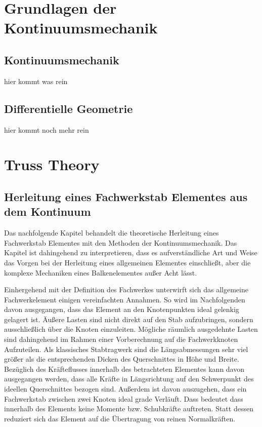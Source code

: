 \documentclass[german,a4paper,12pt,oneside]{scrbook}
\theoremstyle{definition}
\theoremstyle{definition}
\theoremstyle{definition}
\theoremstyle{definition}
\theoremstyle{definition}
\theoremstyle{definition}
\begin{document}

\chapter{Grundlagen der Kontinuumsmechanik}
\section{Kontinuumsmechanik}
hier kommt was rein

\section{Differentielle Geometrie}
hier kommt noch mehr rein

\chapter{Truss Theory}  \setcounter{page}{1}   %




\section{Herleitung eines Fachwerkstab Elementes aus dem Kontinuum}

Das nachfolgende Kapitel behandelt die theoretische Herleitung eines Fachwerkstab Elementes mit den Methoden der Kontinuumsmechanik. Das Kapitel ist dahingehend zu interpretieren, dass es aufverständliche Art und Weise das Vorgen bei der Herleitung eines allgemeinen Elementes einschließt, aber die komplexe Mechaniken eines Balkenelementes außer Acht lässt.

Einhergehend mit der Definition des Fachwerkes unterwirft sich das allgemeine Fachwerkelement einigen vereinfachten Annahmen. So wird im Nachfolgenden davon ausgegangen, dass das Element an den Knotenpunkten ideal gelenkig gelagert ist. Äußere Lasten sind nicht direkt auf den Stab aufzubringen, sondern ausschließlich über die Knoten einzuleiten. Mögliche räumlich ausgedehnte Lasten sind dahingehend im Rahmen einer Vorberechnung auf die Fachwerkknoten Aufzuteilen.  Als klassisches Stabtragwerk sind die Längsabmessungen sehr viel größer als die entsprechenden Dicken des Querschnittes in Höhe und Breite. Bezüglich des Kräfteflusses innerhalb des betrachteten Elementes kann davon ausgegangen werden, dass alle Kräfte in Längsrichtung auf den Schwerpunkt des ideellen Querschnittes bezogen sind. Außerdem ist davon auszugehen, dass ein Fachwerkstab zwischen zwei Knoten ideal grade Verläuft. Dass bedeutet dass innerhalb des Elements keine Momente bzw. Schubkräfte auftreten. Statt dessen reduziert sich das Element auf die Übertragung von reinen Normalkräften.
\end{document}
